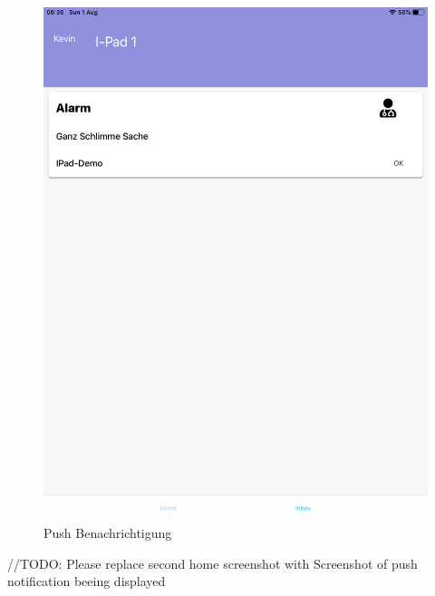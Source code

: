 \begin{figure}[h]
\begin{minipage}[b]{0.4\textwidth}
        \includegraphics[width=\textwidth]{graphics/screenshots/mobileclient/screenshots-inbox}
        \caption{Push Benachrichtigung}
    \end{minipage}
    \label{fig:MobileClient-Screens3}
\end{figure}

//TODO: Please replace second home screenshot with  Screenshot of push notification beeing displayed

\clearpage

